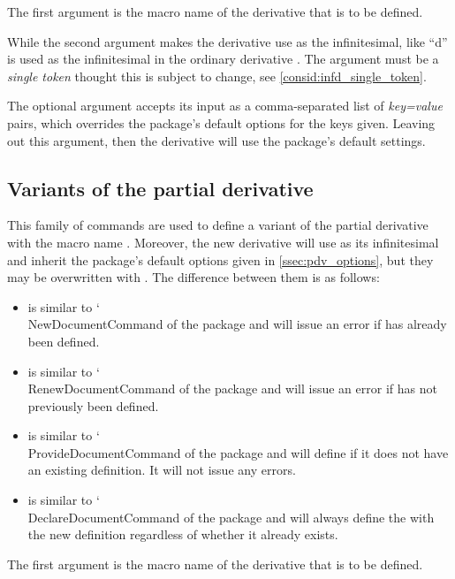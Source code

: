 \documentclass[final,british,10pt]{scrartcl}
\makeatletter
\theoremstyle{remark}
\DeclareRobustCommand\meta[1]{%
	\ensuremath\langle
	\ifmmode \expandafter \nfss@text \fi
	{%
		\meta@font@select
		\edef\meta@hyphen@restore
		{\hyphenchar\the\font\the\hyphenchar\font}%
		\hyphenchar\font\m@ne
		\language\l@nohyphenation
		#1\/%
		\meta@hyphen@restore
	}\ensuremath\rangle
}
\def\meta@font@select{\itshape}
\DeclareRobustCommand\cs[1]{{\CommonFont \char`\\#1}}
\providecommand\oarg[1]{%
	{\ttfamily[}\meta{#1}{\ttfamily]}}
\makeatother
\begin{document}
The first argument is the macro name of the derivative that is to be defined.

While the second argument makes the derivative  use  as the infinitesimal, like \enquote{d} is used as the infinitesimal in the ordinary derivative \macro{\odv}. The argument must be a \emph{single token} thought this is subject to change, see \cref{consid:infd_single_token}.

The optional argument accepts its input as a comma-separated list of \emph{key=value} pairs, which overrides the package's default options for the keys given. Leaving out this argument, then the derivative will use the package's default settings.

\subsection{Variants of the partial derivative} \label{ssec:CreatePdvVariant}
\DescribeMacro{\NewPdvVariant, \RenewPdvVariant, \ProvidePdvVariant, \DeclarePdvVariant}{\meta{control-sequence}, \meta{inf-p}, \oarg{key=value}}
This family of commands are used to define a variant of the partial derivative with the macro name . Moreover, the new derivative will use  as its infinitesimal and inherit the package's default options given in \cref{ssec:pdv_options}, but they may be overwritten with . The difference between them is as follows:

\begin{itemize}
	\item {} is similar to \cs{NewDocumentCommand} of the  package and will issue an error if  has already been defined.
	\item {} is similar to \cs{RenewDocumentCommand} of the  package and will issue an error if  has not previously been defined.
	\item {} is similar to \cs{ProvideDocumentCommand} of the  package and will define  if it does not have an existing definition. It will not issue any errors.
	\item {} is similar to \cs{DeclareDocumentCommand} of the  package and will always define the  with the new definition regardless of whether it already exists.
\end{itemize}

The first argument is the macro name of the derivative that is to be defined.
\end{document}
